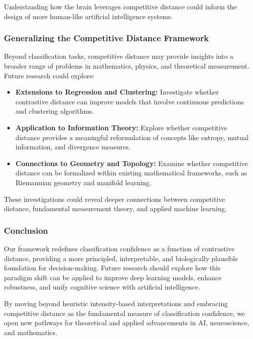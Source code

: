 \documentclass[12pt]{article}
\begin{document}
Understanding how the brain leverages competitive distance could inform the design of more human-like artificial intelligence systems.

\subsubsection{Generalizing the Competitive Distance Framework}

Beyond classification tasks, competitive distance may provide insights into a broader range of problems in mathematics, physics, and theoretical measurement. Future research could explore:

\begin{itemize}
    \item \textbf{Extensions to Regression and Clustering:} Investigate whether contrastive distance can improve models that involve continuous predictions and clustering algorithms.
    \item \textbf{Application to Information Theory:} Explore whether competitive distance provides a meaningful reformulation of concepts like entropy, mutual information, and divergence measures.
    \item \textbf{Connections to Geometry and Topology:} Examine whether competitive distance can be formalized within existing mathematical frameworks, such as Riemannian geometry and manifold learning.
\end{itemize}

These investigations could reveal deeper connections between competitive distance, fundamental measurement theory, and applied machine learning.

\subsubsection{Conclusion}

Our framework redefines classification confidence as a function of contrastive distance, providing a more principled, interpretable, and biologically plausible foundation for decision-making. Future research should explore how this paradigm shift can be applied to improve deep learning models, enhance robustness, and unify cognitive science with artificial intelligence.

By moving beyond heuristic intensity-based interpretations and embracing competitive distance as the fundamental measure of classification confidence, we open new pathways for theoretical and applied advancements in AI, neuroscience, and mathematics.
\end{document}
